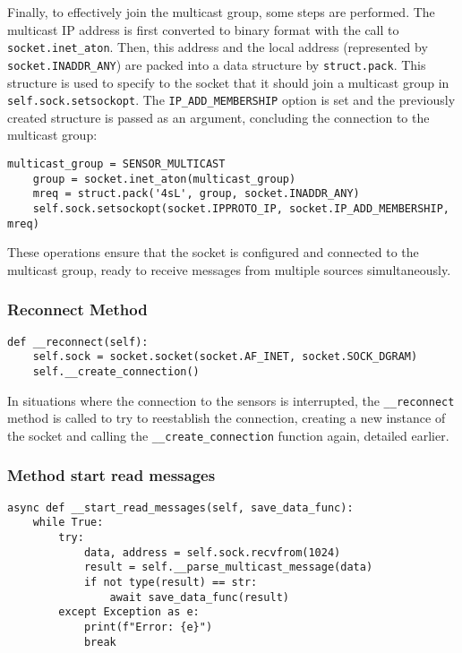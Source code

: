 Finally, to effectively join the multicast group, some steps are performed. The multicast IP address is first converted to binary format with the call to \texttt{socket.inet\_aton}. Then, this address and the local address (represented by \texttt{socket.INADDR\_ANY}) are packed into a data structure by \texttt{struct.pack}. This structure is used to specify to the socket that it should join a multicast group in \texttt{self.sock.setsockopt}. The \texttt{IP\_ADD\_MEMBERSHIP} option is set and the previously created structure is passed as an argument, concluding the connection to the multicast group:

\begin{Verbatim}[fontsize=\small, baselinestretch=0.8]
    multicast_group = SENSOR_MULTICAST
    group = socket.inet_aton(multicast_group)
    mreq = struct.pack('4sL', group, socket.INADDR_ANY)
    self.sock.setsockopt(socket.IPPROTO_IP, socket.IP_ADD_MEMBERSHIP, mreq)
\end{Verbatim}

These operations ensure that the socket is configured and connected to the multicast group, ready to receive messages from multiple sources simultaneously.


\subsubsection[Reconnect Method]{Reconnect Method}
\begin{Verbatim}[fontsize=\small, baselinestretch=0.8]
def __reconnect(self):
    self.sock = socket.socket(socket.AF_INET, socket.SOCK_DGRAM)
    self.__create_connection()
\end{Verbatim}

In situations where the connection to the sensors is interrupted, the \texttt{\_\_reconnect} method is called to try to reestablish the connection, creating a new instance of the socket and calling the \texttt{\_\_create\_connection} function again, detailed earlier.

\subsubsection[Method start read messages]{Method start read messages}

\begin{Verbatim}[fontsize=\small, baselinestretch=0.8]
async def __start_read_messages(self, save_data_func):
    while True:
        try:
            data, address = self.sock.recvfrom(1024)
            result = self.__parse_multicast_message(data)
            if not type(result) == str:
                await save_data_func(result)
        except Exception as e:
            print(f"Error: {e}")
            break
\end{Verbatim}

